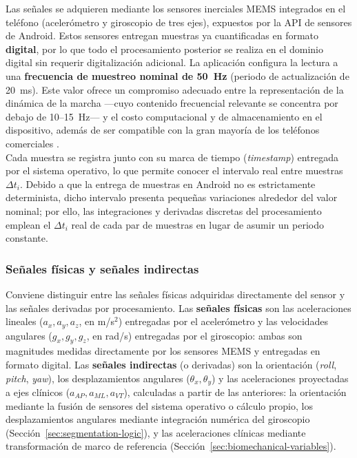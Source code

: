 \documentclass[12pt]{report}
\begin{document}
\begin{justify}
    Las señales se adquieren mediante los sensores inerciales MEMS integrados en el teléfono (acelerómetro y giroscopio de tres ejes), expuestos por la API de sensores de Android. Estos sensores entregan muestras ya cuantificadas en formato \textbf{digital}, por lo que todo el procesamiento posterior se realiza en el dominio digital sin requerir digitalización adicional. La aplicación configura la lectura a una \textbf{frecuencia de muestreo nominal de 50~Hz} (periodo de actualización de 20~ms). Este valor ofrece un compromiso adecuado entre la representación de la dinámica de la marcha —cuyo contenido frecuencial relevante se concentra por debajo de 10--15~Hz— y el costo computacional y de almacenamiento en el dispositivo, además de ser compatible con la gran mayoría de los teléfonos comerciales \cite{reliabilty-smartphone-kinematic}.\\

    Cada muestra se registra junto con su marca de tiempo (\textit{timestamp}) entregada por el sistema operativo, lo que permite conocer el intervalo real entre muestras $\Delta t_i$. Debido a que la entrega de muestras en Android no es estrictamente determinista, dicho intervalo presenta pequeñas variaciones alrededor del valor nominal; por ello, las integraciones y derivadas discretas del procesamiento emplean el $\Delta t_i$ real de cada par de muestras en lugar de asumir un periodo constante.

    \subsubsection*{Señales físicas y señales indirectas}

    Conviene distinguir entre las señales físicas adquiridas directamente del sensor y las señales derivadas por procesamiento. Las \textbf{señales físicas} son las aceleraciones lineales ($a_x, a_y, a_z$, en m/s$^2$) entregadas por el acelerómetro y las velocidades angulares ($g_x, g_y, g_z$, en rad/s) entregadas por el giroscopio: ambas son magnitudes medidas directamente por los sensores MEMS y entregadas en formato digital. Las \textbf{señales indirectas} (o derivadas) son la orientación (\textit{roll}, \textit{pitch}, \textit{yaw}), los desplazamientos angulares ($\theta_x, \theta_y$) y las aceleraciones proyectadas a ejes clínicos ($a_{AP}, a_{ML}, a_{VT}$), calculadas a partir de las anteriores: la orientación mediante la fusión de sensores del sistema operativo o cálculo propio, los desplazamientos angulares mediante integración numérica del giroscopio (Sección~\ref{sec:segmentation-logic}), y las aceleraciones clínicas mediante transformación de marco de referencia (Sección~\ref{sec:biomechanical-variables}).


\end{justify}
\end{document}
